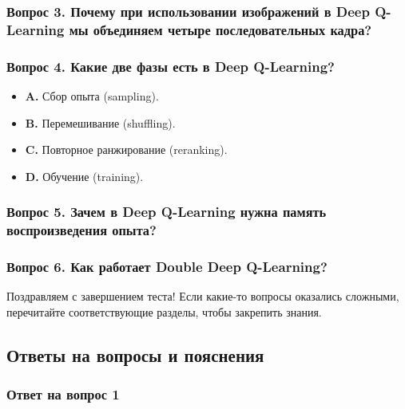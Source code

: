 \documentclass[11pt,a4paper]{article}
\begin{document}
\subsubsection{Вопрос 3. Почему при использовании изображений в Deep Q-Learning мы объединяем четыре последовательных кадра?}\label{q3-why-do-we-stack-four-frames-together-when-we-use-frames-as-input-in-deep-q-learning}

\subsubsection{Вопрос 4. Какие две фазы есть в Deep Q-Learning?}\label{q4-what-are-the-two-phases-of-deep-q-learning}

\begin{itemize}
\tightlist
\item
\textbf{A.} Сбор опыта (sampling).
\item
\textbf{B.} Перемешивание (shuffling).
\item
\textbf{C.} Повторное ранжирование (reranking).
\item
\textbf{D.} Обучение (training).
\end{itemize}

\subsubsection{Вопрос 5. Зачем в Deep Q-Learning нужна память воспроизведения опыта?}\label{q5-why-do-we-create-a-replay-memory-in-deep-q-learning}

\subsubsection{Вопрос 6. Как работает Double Deep Q-Learning?}\label{q6-how-do-we-use-double-deep-q-learning}

Поздравляем с завершением теста! Если какие-то вопросы оказались сложными, перечитайте соответствующие разделы, чтобы закрепить знания.

\subsection{Ответы на вопросы и пояснения}\label{quiz-solutions-and-explanations}

\subsubsection{Ответ на вопрос 1}\label{q1-solution}
\end{document}
